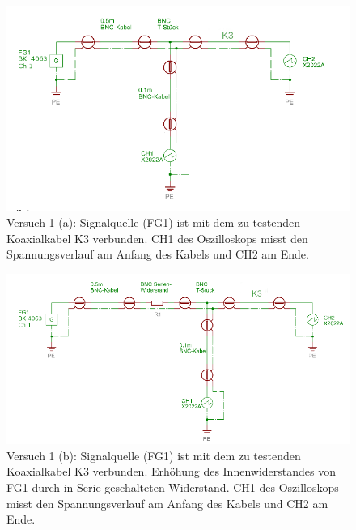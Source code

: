 \documentclass{article}
\begin{document}
\begin{figure}[H]
\centering
\caption{Versuch 1 (a): Signalquelle (FG1) ist mit dem zu testenden Koaxialkabel K3 verbunden. CH1 des Oszilloskops misst den Spannungsverlauf am Anfang des Kabels und CH2 am Ende.}
\label{fig:anordnung_task1a}
\includegraphics[scale=2]{task1a.png}
\end{figure}



\begin{figure}[H]
\centering
\caption{Versuch 1 (b): Signalquelle (FG1) ist mit dem zu testenden Koaxialkabel K3 verbunden. Erhöhung des Innenwiderstandes von FG1 durch in Serie geschalteten Widerstand. CH1 des Oszilloskops misst den Spannungsverlauf am Anfang des Kabels und CH2 am Ende.}
\label{fig:anordnung_task1b}
\includegraphics[scale=2]{task1b.png}
\end{figure}
\end{document}
